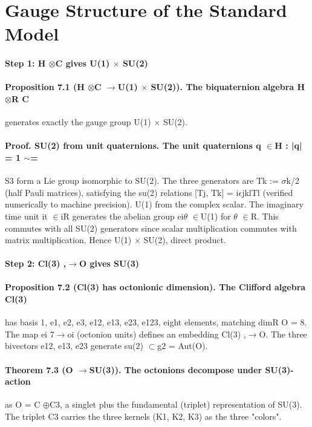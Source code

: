 \section{Gauge Structure of the Standard Model}
\paragraph*{Step 1: H $\otimes$C gives U(1) $\times$ SU(2)}
\paragraph*{Proposition 7.1 (H $\otimes$C $\to$U(1) $\times$ SU(2)). The biquaternion algebra H $\otimes$R C}
generates exactly the gauge group U(1) $\times$ SU(2).
\paragraph*{Proof. SU(2) from unit quaternions. The unit quaternions {q $\in$H : |q| = 1} $\sim$=}
S3 form a Lie group isomorphic to SU(2). The three generators are Tk := $\sigma$k/2 (half Pauli matrices), satisfying the su(2) relations [Tj, Tk] = i$\epsilon$jklTl (verified numerically to machine precision). U(1) from the complex scalar. The imaginary time unit it $\in$iR generates the abelian group ei$\theta$ $\in$U(1) for $\theta$ $\in$R. This commutes with all SU(2) generators since scalar multiplication commutes with matrix multiplication. Hence U(1) $\times$ SU(2), direct product.
\paragraph*{Step 2: Cl(3) ,$\to$O gives SU(3)}
\paragraph*{Proposition 7.2 (Cl(3) has octonionic dimension). The Clifford algebra Cl(3)}
has basis {1, e1, e2, e3, e12, e13, e23, e123}, eight elements, matching dimR O = 8. The map ei 7$\to$oi (octonion units) defines an embedding Cl(3) ,$\to$O. The three bivectors e12, e13, e23 generate su(2) $\subset$g2 = Aut(O).
\paragraph*{Theorem 7.3 (O $\to$SU(3)). The octonions decompose under SU(3)-action}
as O = C $\oplus$C3,
a singlet plus the fundamental (triplet) representation of SU(3). The triplet C3 carries the three kernels (K1, K2, K3) as the three "colors".
